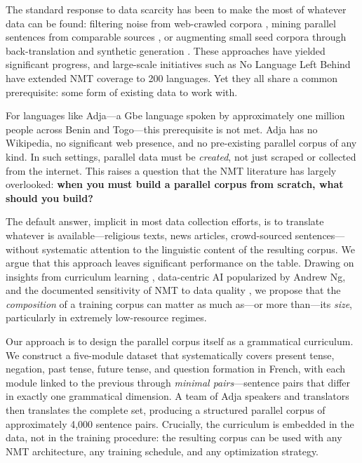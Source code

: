 \documentclass[11pt]{article}
\begin{document}
The standard response to data scarcity has been to make the most of whatever data can be found: filtering noise from web-crawled corpora \cite{junczys-dowmunt-2018-dual, herold_detecting_2022 }, mining parallel sentences from comparable sources \cite{artetxe-schwenk-2019-massively}, or augmenting small seed corpora through back-translation and synthetic generation \cite{sennrich-etal-2016-neural}. These approaches have yielded significant progress, and large-scale initiatives such as No Language Left Behind \cite{nllbteam2022languageleftbehindscaling} have extended NMT coverage to 200 languages. Yet they all share a common prerequisite: some form of existing data to work with.

For languages like Adja---a Gbe language spoken by approximately one million people across Benin and Togo---this prerequisite is not met. Adja has no Wikipedia, no significant web presence, and no pre-existing parallel corpus of any kind. In such settings, parallel data must be \emph{created}, not just scraped or collected from the internet. This raises a question that the NMT literature has largely overlooked: \textbf{when you must build a parallel corpus from scratch, what should you build?}

The default answer, implicit in most data collection efforts, is to translate whatever is available---religious texts, news articles, crowd-sourced sentences---without systematic attention to the linguistic content of the resulting corpus. We argue that this approach leaves significant performance on the table. Drawing on insights from curriculum learning \cite{bengioetal, platanios2019competencebasedcurriculumlearningneural,nobodywannadodata}, data-centric AI popularized by Andrew Ng, and the documented sensitivity of NMT to data quality \cite{khayrallah-koehn-2018-impact}, we propose that the \emph{composition} of a training corpus can matter as much as---or more than---its \emph{size}, particularly in extremely low-resource regimes.

Our approach is to design the parallel corpus itself as a grammatical curriculum. We construct a five-module dataset that systematically covers present tense, negation, past tense, future tense, and question formation in French, with each module linked to the previous through \emph{minimal pairs}---sentence pairs that differ in exactly one grammatical dimension. A team of Adja speakers and translators then translates the complete set, producing a structured parallel corpus of approximately 4,000 sentence pairs. Crucially, the curriculum is embedded in the data, not in the training procedure: the resulting corpus can be used with any NMT architecture, any training schedule, and any optimization strategy.
\end{document}
